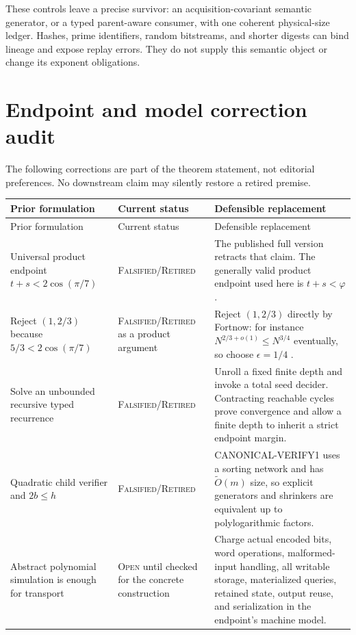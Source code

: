 \documentclass[11pt]{article}
\newcommand{\Open}{\textsc{Open}}
\newcommand{\Retired}{\textsc{Falsified/}\allowbreak\textsc{Retired}}
\begin{document}
These controls leave a precise survivor: an acquisition-covariant semantic
generator, or a typed parent-aware consumer, with one coherent physical-size
ledger.  Hashes, prime identifiers, random bitstreams, and shorter digests
can bind lineage and expose replay errors.  They do not supply this semantic
object or change its exponent obligations.

\section{Endpoint and model correction audit}

The following corrections are part of the theorem statement, not editorial
preferences.  No downstream claim may silently restore a retired premise.

{\small
\begin{longtable}{L{0.29\textwidth}L{0.20\textwidth}L{0.40\textwidth}}
\toprule
Prior formulation & Current status & Defensible replacement \\
\midrule
\endfirsthead
\toprule
Prior formulation & Current status & Defensible replacement \\
\midrule
\endhead
\bottomrule
\endfoot
Universal product endpoint $t+s<2\cos(\pi/7)$ & \Retired{} & The published
full version retracts that claim.  The generally valid product endpoint used
here is $t+s<\varphi$ \cite{williams2010}. \\
Reject $(1,2/3)$ because $5/3<2\cos(\pi/7)$ & \Retired{} as a product
argument & Reject $(1,2/3)$ directly by Fortnow: for instance
$N^{2/3+o(1)}\le N^{3/4}$ eventually, so choose $\epsilon=1/4$
\cite{fortnow2000}. \\
Solve an unbounded recursive typed recurrence & \Retired{} & Unroll a fixed
finite depth and invoke a total seed decider.  Contracting reachable cycles
prove convergence and allow a finite depth to inherit a strict endpoint
margin. \\
Quadratic child verifier and $2b\le h$ & \Retired{} &
CANONICAL-VERIFY1 uses a sorting network and has $\widetilde O(m)$ size, so
explicit generators and shrinkers are equivalent up to polylogarithmic
factors. \\
Abstract polynomial simulation is enough for transport & \Open{} until
checked for the concrete construction & Charge actual encoded bits, word
operations, malformed-input handling, all writable storage, materialized
queries, retained state, output reuse, and serialization in the endpoint's
machine model. \\
\end{longtable}
}
\end{document}

